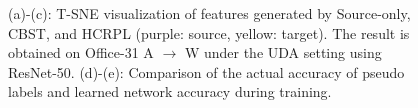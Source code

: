 \documentclass[a4paper,fleqn]{cas-dc}
\begin{document}
	\begin{figure}
		\centering
		\caption{(a)-(c): T-SNE visualization of features generated by Source-only, CBST, and HCRPL (purple: source, yellow: target). The result is obtained on Office-31 A $\rightarrow$ W under the UDA setting using ResNet-50. (d)-(e): Comparison of the actual accuracy of pseudo labels and learned network accuracy during training. 
		}\label{fig8}
	\end{figure}
	
\end{document}
